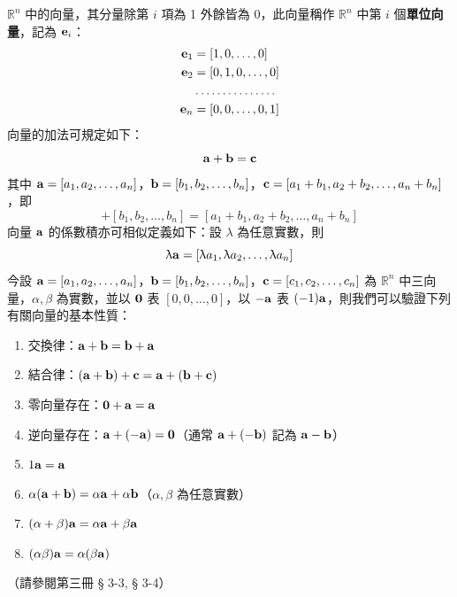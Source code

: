 $\mathbb{R}^n$ 中的向量，其分量除第 $i$ 項為 1 外餘皆為 0，此向量稱作 $\mathbb{R}^n$ 中第 $i$ 個\textbf{單位向量}，記為 $\boldsymbol{\mathbf{e}}_i$：
\begin{equation}
\begin{aligned}
\boldsymbol{\mathbf{e}}_1 &= [1, 0, \dots, 0] \\
\boldsymbol{\mathbf{e}}_2 &= [0, 1, 0, \dots, 0] \\
&\dots\dots\dots\dots\dots \\
\boldsymbol{\mathbf{e}}_n &= [0, 0, \dots, 0, 1]
\end{aligned} \label{eq:b6-1-1-3}
\end{equation}
向量的加法可規定如下：
\[ \boldsymbol{\mathbf{a}} + \boldsymbol{\mathbf{b}} = \boldsymbol{\mathbf{c}} \]
其中 $\boldsymbol{\mathbf{a}}=[a_1, a_2, \dots, a_n]$，$\boldsymbol{\mathbf{b}}=[b_1, b_2, \dots, b_n]$，$\boldsymbol{\mathbf{c}}=[a_1+b_1, a_2+b_2, \dots, a_n+b_n]$，即
\begin{equation}
[a_1, a_2, \dots, a_n] + [b_1, b_2, \dots, b_n] = [a_1+b_1, a_2+b_2, \dots, a_n+b_n] \label{eq:b6-1-1-4}
\end{equation}
向量 $\boldsymbol{\mathbf{a}}$ 的係數積亦可相似定義如下：設 $\lambda$ 為任意實數，則
\begin{equation}
\uplambda \boldsymbol{\mathbf{a}} = [\uplambda a_1, \uplambda a_2, \dots, \uplambda a_n] \label{eq:b6-1-1-5}
\end{equation}
今設 $\boldsymbol{\mathbf{a}}=[a_1, a_2, \dots, a_n]$，$\boldsymbol{\mathbf{b}}=[b_1, b_2, \dots, b_n]$，$\boldsymbol{\mathbf{c}}=[c_1, c_2, \dots, c_n]$ 為 $\mathbb{R}^n$ 中三向量，$\alpha, \beta$ 為實數，並以 $\boldsymbol{\mathbf{0}}$ 表 $[0, 0, \dots, 0]$，以 $-\boldsymbol{\mathbf{a}}$ 表 $(-1)\boldsymbol{\mathbf{a}}$，則我們可以驗證下列有關向量的基本性質：
\begin{enumerate}[label=\Roman*., leftmargin=2.5em]
  \item 交換律：$\boldsymbol{\mathbf{a}}+\boldsymbol{\mathbf{b}} = \boldsymbol{\mathbf{b}}+\boldsymbol{\mathbf{a}}$
  \item 結合律：$(\boldsymbol{\mathbf{a}}+\boldsymbol{\mathbf{b}})+\boldsymbol{\mathbf{c}} = \boldsymbol{\mathbf{a}}+(\boldsymbol{\mathbf{b}}+\boldsymbol{\mathbf{c}})$
  \item 零向量存在：$\boldsymbol{\mathbf{0}}+\boldsymbol{\mathbf{a}} = \boldsymbol{\mathbf{a}}$
  \item 逆向量存在：$\boldsymbol{\mathbf{a}}+(-\boldsymbol{\mathbf{a}}) = \boldsymbol{\mathbf{0}}$（通常 $\boldsymbol{\mathbf{a}}+(-\boldsymbol{\mathbf{b}})$ 記為 $\boldsymbol{\mathbf{a}}-\boldsymbol{\mathbf{b}}$）
  \item $1\boldsymbol{\mathbf{a}} = \boldsymbol{\mathbf{a}}$
  \item $\alpha(\boldsymbol{\mathbf{a}}+\boldsymbol{\mathbf{b}}) = \alpha\boldsymbol{\mathbf{a}} + \alpha\boldsymbol{\mathbf{b}}$（$\alpha, \beta$ 為任意實數）
  \item $(\alpha+\beta)\boldsymbol{\mathbf{a}} = \alpha\boldsymbol{\mathbf{a}} + \beta\boldsymbol{\mathbf{a}}$
  \item $(\alpha\beta)\boldsymbol{\mathbf{a}} = \alpha(\beta\boldsymbol{\mathbf{a}})$
\end{enumerate}
（請參閱第三冊 § 3-3, § 3-4）

